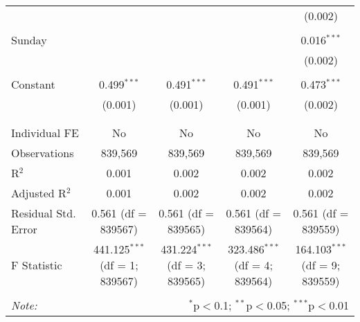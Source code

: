 \documentclass[
]{article}
\begin{document}
\begin{table}[!htbp]
{\begin{tabular}{@{\extracolsep{5pt}}lcccc}
  &  &  &  & (0.002) \\ 
  & & & & \\ 
 Sunday &  &  &  & 0.016$^{***}$ \\ 
  &  &  &  & (0.002) \\ 
  & & & & \\ 
 Constant & 0.499$^{***}$ & 0.491$^{***}$ & 0.491$^{***}$ & 0.473$^{***}$ \\ 
  & (0.001) & (0.001) & (0.001) & (0.002) \\ 
  & & & & \\ 
\hline \\[-1.8ex] 
Individual FE & No & No & No & No \\ 
Observations & 839,569 & 839,569 & 839,569 & 839,569 \\ 
R$^{2}$ & 0.001 & 0.002 & 0.002 & 0.002 \\ 
Adjusted R$^{2}$ & 0.001 & 0.002 & 0.002 & 0.002 \\ 
Residual Std. Error & 0.561 (df = 839567) & 0.561 (df = 839565) & 0.561 (df = 839564) & 0.561 (df = 839559) \\ 
F Statistic & 441.125$^{***}$ (df = 1; 839567) & 431.224$^{***}$ (df = 3; 839565) & 323.486$^{***}$ (df = 4; 839564) & 164.103$^{***}$ (df = 9; 839559) \\ 
\hline 
\hline \\[-1.8ex] 
\textit{Note:}  & \multicolumn{4}{r}{$^{*}$p$<$0.1; $^{**}$p$<$0.05; $^{***}$p$<$0.01} \\ 
\end{tabular}
} 
\end{table} 
\newpage
\end{document}
